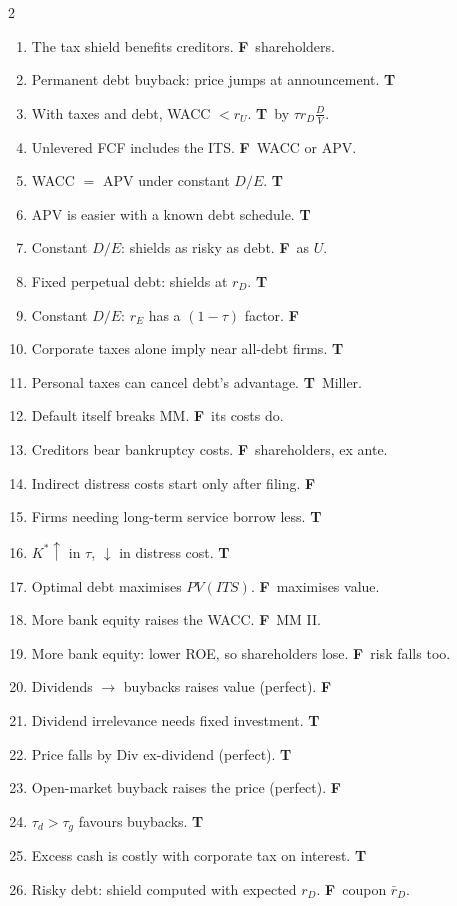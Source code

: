 \documentclass[8pt,a4paper]{extarticle}
\newcommand{\T}{\textbf{\color{ok}T}~}
\newcommand{\F}{\textbf{\color{wr}F}~}
\begin{document}
\begin{multicols}{2}
\begin{enumerate}[label=\arabic*.,start=48,leftmargin=1.6em,itemsep=0pt]
  \item The tax shield benefits creditors. \F{}shareholders.
  \item Permanent debt buyback: price jumps at announcement. \T
  \item With taxes and debt, WACC $<r_U$. \T{}by $\tau r_D\frac DV$.
  \item Unlevered FCF includes the ITS. \F{}WACC or APV.
  \item WACC $=$ APV under constant $D/E$. \T
  \item APV is easier with a known debt schedule. \T
  \item Constant $D/E$: shields as risky as debt. \F{}as $U$.
  \item Fixed perpetual debt: shields at $r_D$. \T
  \item Constant $D/E$: $r_E$ has a $(1-\tau)$ factor. \F
  \item Corporate taxes alone imply near all-debt firms. \T
  \item Personal taxes can cancel debt's advantage. \T{}Miller.
  \item Default itself breaks MM. \F{}its costs do.
  \item Creditors bear bankruptcy costs. \F{}shareholders, ex ante.
  \item Indirect distress costs start only after filing. \F
  \item Firms needing long-term service borrow less. \T
  \item $K^*\uparrow$ in $\tau$, $\downarrow$ in distress cost. \T
  \item Optimal debt maximises $PV(ITS)$. \F{}maximises value.
  \item More bank equity raises the WACC. \F{}MM II.
  \item More bank equity: lower ROE, so shareholders lose. \F{}risk falls too.
  \item Dividends $\to$ buybacks raises value (perfect). \F
  \item Dividend irrelevance needs fixed investment. \T
  \item Price falls by Div ex-dividend (perfect). \T
  \item Open-market buyback raises the price (perfect). \F
  \item $\tau_d>\tau_g$ favours buybacks. \T
  \item Excess cash is costly with corporate tax on interest. \T
  \item Risky debt: shield computed with expected $r_D$. \F{}coupon $\bar r_D$.

\end{enumerate}
\end{multicols}
\end{document}
